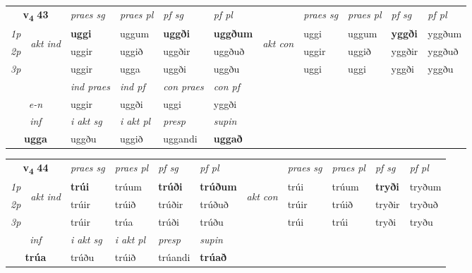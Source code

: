 \noindent
\begin{tabular}{lllllllllll} \toprule
\multicolumn{2}{c}{\textbf{v{\textsubscript{4}}} \Large{\textbf{43}}}  &  \textit{praes sg}  & \textit{praes pl}  &\textit{ pf sg} & \textit{pf pl} &  &  \textit{praes sg}  & \textit{praes pl}  & \textit{pf sg} & \textit{pf pl } \\*
	\cmidrule{3-6} \cmidrule{8-11}
 {\textit{1p}} & \multirow{3}{*}{\begin{turn}{90}\textit{akt ind}\end{turn}} & \textbf{uggi} & uggum & \textbf{uggði} & \textbf{uggðum} & \multirow{3}{*}{\begin{turn}{90}\textit{akt con}\end{turn}} &uggi & uggum & \textbf{yggði} & yggðum\\*
 {\textit{2p}} &  &  uggir  & uggið & uggðir & uggðuð & & uggir & uggið & yggðir & yggðuð \\*
{\textit{3p}} &  & uggir & ugga & uggði & uggðu & & uggi & uggi& yggði & yggðu \\*
\cmidrule{3-6} \cmidrule{8-11}

   & &  \textit{ind praes} & \textit{ind pf} & \textit{con praes} & \textit{con pf} \\*
\multicolumn{2}{c}{ \textit{e-n} } & uggir & uggði & uggi & yggði \\*

\cmidrule{3-6}
   \multicolumn{2}{c}{\textit{inf}}  & \textit{i akt sg} & \textit{i akt pl}   & \textit{presp} & \textit{supin}   \\*
  \multicolumn{2}{c}{\textbf{ugga}} & uggðu  & uggið   & uggandi &  \textbf{uggað}   \\*
\end{tabular}

\noindent
\begin{tabular}{lllllllllll} \toprule
\multicolumn{2}{c}{\textbf{v{\textsubscript{4}}} \Large{\textbf{44}}}  &  \textit{praes sg}  & \textit{praes pl}  &\textit{ pf sg} & \textit{pf pl} &  &  \textit{praes sg}  & \textit{praes pl}  & \textit{pf sg} & \textit{pf pl } \\*
	\cmidrule{3-6} \cmidrule{8-11}
 {\textit{1p}} & \multirow{3}{*}{\begin{turn}{90}\textit{akt ind}\end{turn}} & \textbf{trúi} & trúum & \textbf{trúði} & \textbf{trúðum} & \multirow{3}{*}{\begin{turn}{90}\textit{akt con}\end{turn}} &trúi & trúum & \textbf{tryði} & tryðum\\*
 {\textit{2p}} &  &  trúir  & trúið & trúðir & trúðuð & & trúir & trúið & tryðir & tryðuð \\*
{\textit{3p}} &  & trúir & trúa & trúði & trúðu & & trúi & trúi& tryði & tryðu \\*
\cmidrule{3-6} \cmidrule{8-11}

   \multicolumn{2}{c}{\textit{inf}}  & \textit{i akt sg} & \textit{i akt pl}   & \textit{presp} & \textit{supin}   \\*
  \multicolumn{2}{c}{\textbf{trúa}} & trúðu  & trúið   & trúandi &  \textbf{trúað}   \\*
\end{tabular}

